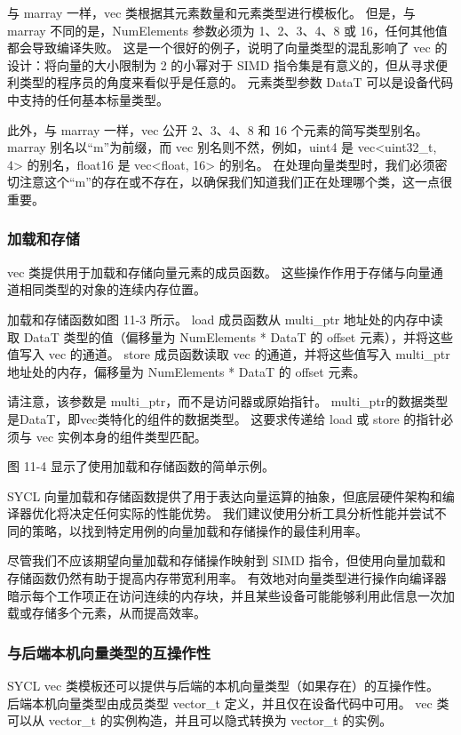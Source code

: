 与 marray 一样，vec 类根据其元素数量和元素类型进行模板化。 但是，与 marray 不同的是，NumElements 参数必须为 1、2、3、4、8 或 16，任何其他值都会导致编译失败。 这是一个很好的例子，说明了向量类型的混乱影响了 vec 的设计：将向量的大小限制为 2 的小幂对于 SIMD 指令集是有意义的，但从寻求便利类型的程序员的角度来看似乎是任意的。 元素类型参数 DataT 可以是设备代码中支持的任何基本标量类型。

此外，与 marray 一样，vec 公开 2、3、4、8 和 16 个元素的简写类型别名。 marray 别名以“m”为前缀，而 vec 别名则不然，例如，uint4 是 vec<uint32\_t, 4> 的别名，float16 是 vec<float, 16> 的别名。 在处理向量类型时，我们必须密切注意这个“m”的存在或不存在，以确保我们知道我们正在处理哪个类，这一点很重要。

\subsubsection{加载和存储}
vec 类提供用于加载和存储向量元素的成员函数。 这些操作作用于存储与向量通道相同类型的对象的连续内存位置。

加载和存储函数如图 11-3 所示。 load 成员函数从 multi\_ptr 地址处的内存中读取 DataT 类型的值（偏移量为 NumElements * DataT 的 offset 元素），并将这些值写入 vec 的通道。 store 成员函数读取 vec 的通道，并将这些值写入 multi\_ptr 地址处的内存，偏移量为 NumElements * DataT 的 offset 元素。

请注意，该参数是 multi\_ptr，而不是访问器或原始指针。 multi\_ptr的数据类型是DataT，即vec类特化的组件的数据类型。 这要求传递给 load 或 store 的指针必须与 vec 实例本身的组件类型匹配。

图 11-4 显示了使用加载和存储函数的简单示例。

SYCL 向量加载和存储函数提供了用于表达向量运算的抽象，但底层硬件架构和编译器优化将决定任何实际的性能优势。 我们建议使用分析工具分析性能并尝试不同的策略，以找到特定用例的向量加载和存储操作的最佳利用率。

尽管我们不应该期望向量加载和存储操作映射到 SIMD 指令，但使用向量加载和存储函数仍然有助于提高内存带宽利用率。 有效地对向量类型进行操作向编译器暗示每个工作项正在访问连续的内存块，并且某些设备可能能够利用此信息一次加载或存储多个元素，从而提高效率。

\subsubsection{与后端本机向量类型的互操作性}
SYCL vec 类模板还可以提供与后端的本机向量类型（如果存在）的互操作性。 后端本机向量类型由成员类型 vector\_t 定义，并且仅在设备代码中可用。 vec 类可以从 vector\_t 的实例构造，并且可以隐式转换为 vector\_t 的实例。

